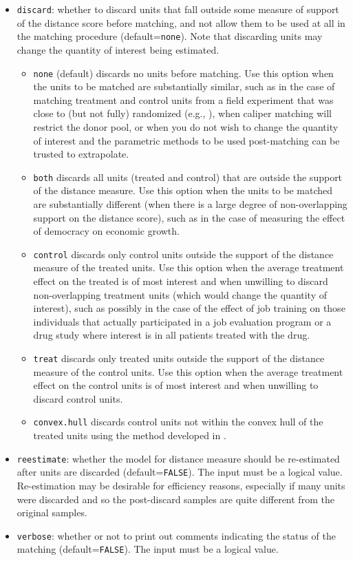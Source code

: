 \begin{itemize}
\item \texttt{discard}: whether to discard units that fall outside
  some measure of support of the distance score before matching, and
  not allow them to be used at all in the matching procedure
  (default=\texttt{none}).  Note that discarding units may change the
  quantity of interest being estimated.
  \begin{itemize}
  \item \texttt{none} (default) discards no units before matching.
    Use this option when the units to be matched are substantially
    similar, such as in the case of matching treatment and control
    units from a field experiment that was close to (but not fully)
    randomized (e.g., \citealt{Imai05}), when caliper matching will
    restrict the donor pool, or when you do not wish to change the
    quantity of interest and the parametric methods to be used
    post-matching can be trusted to extrapolate.
  \item \texttt{both} discards all units (treated and control) that
    are outside the support of the distance measure. Use this option
    when the units to be matched are substantially different (when
    there is a large degree of non-overlapping support on the distance
    score), such as in the case of measuring the effect of democracy
    on economic growth.
  \item \texttt{control} discards only control units outside the
    support of the distance measure of the treated units.  Use this
    option when the average treatment effect on the treated is of most
    interest and when unwilling to discard non-overlapping treatment
    units (which would change the quantity of interest), such as
    possibly in the case of the effect of job training on those
    individuals that actually participated in a job evaluation program
    or a drug study where interest is in all patients treated with the
    drug.
  \item \texttt{treat} discards only treated units outside the support
    of the distance measure of the control units.  Use this option
    when the average treatment effect on the control units is of most
    interest and when unwilling to discard control units.
  \item \texttt{convex.hull} discards control units not within the
    convex hull of the treated units using the method developed in
    \citep{KinZen05b}.
  \end{itemize}
  
\item \texttt{reestimate}: whether the model for distance measure
  should be re-estimated after units are discarded
  (default=\texttt{FALSE}). The input must be a logical value.
  Re-estimation may be desirable for efficiency reasons, especially if
  many units were discarded and so the post-discard samples are quite
  different from the original samples.
  
\item \texttt{verbose}: whether or not to print out comments
  indicating the status of the matching (default=\texttt{FALSE}). The
  input must be a logical value.
\end{itemize}


